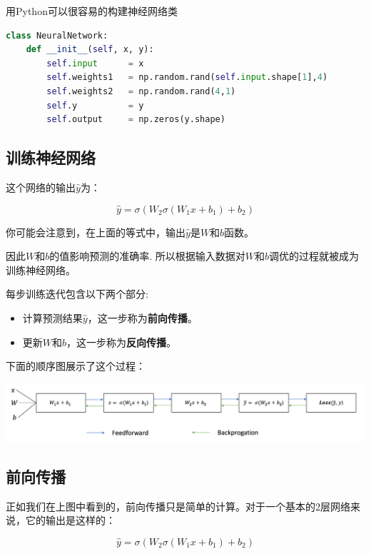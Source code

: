 用Python可以很容易的构建神经网络类

\begin{lstlisting}[language=python, breaklines]
class NeuralNetwork:
    def __init__(self, x, y):
        self.input      = x
        self.weights1   = np.random.rand(self.input.shape[1],4) 
        self.weights2   = np.random.rand(4,1)                 
        self.y          = y
        self.output     = np.zeros(y.shape)
\end{lstlisting}

\subsection{训练神经网络}

这个网络的输出$\hat{y}$为：

\begin{equation}
    \hat{y} = \sigma (W_2 \sigma (W_1 x + b_1) + b_2)
\end{equation}

你可能会注意到，在上面的等式中，输出$\hat{y}$是$W$和$b$函数。

因此$W$和$b$的值影响预测的准确率. 所以根据输入数据对$W$和$b$调优的过程就被成为训练神经网络。

每步训练迭代包含以下两个部分:

\begin{itemize}
    \item 计算预测结果$\hat{y}$，这一步称为\textbf{前向传播}。
    \item 更新$W$和$b$，这一步称为\textbf{反向传播}。
\end{itemize}

下面的顺序图展示了这个过程：

\noindent\includegraphics[width=\textwidth]{2.png}

\subsection{前向传播}

正如我们在上图中看到的，前向传播只是简单的计算。对于一个基本的2层网络来说，它的输出是这样的：

\begin{equation}
    \hat{y} = \sigma (W_2 \sigma (W_1 x + b_1) + b_2)
\end{equation}

